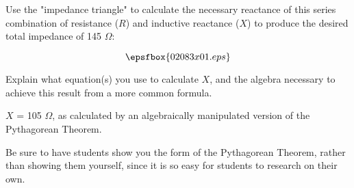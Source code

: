 

Use the "impedance triangle" to calculate the necessary reactance of this series combination of resistance ($R$) and inductive reactance ($X$) to produce the desired total impedance of 145 $\Omega$:

$$\epsfbox{02083x01.eps}$$

Explain what equation(s) you use to calculate $X$, and the algebra necessary to achieve this result from a more common formula.







$X$ = 105 $\Omega$, as calculated by an algebraically manipulated version of the Pythagorean Theorem.







Be sure to have students show you the form of the Pythagorean Theorem, rather than showing them yourself, since it is so easy for students to research on their own.




